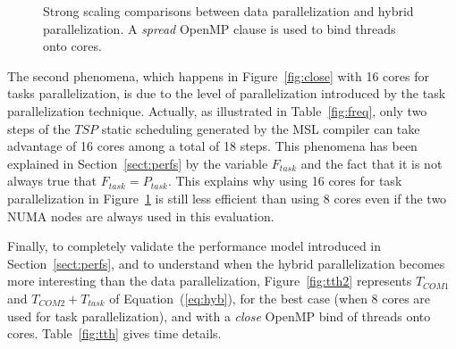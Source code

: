 \begin{figure}[!h]\begin{center}
  \caption{Strong scaling comparisons between data parallelization and hybrid parallelization. A \emph{spread} OpenMP clause is used to bind threads onto cores.}
  \label{fig:spread}
\end{center}\end{figure}

The second phenomena, which happens in Figure~\ref{fig:close} with 16 cores for tasks parallelization, is due to the level of parallelization introduced by the task parallelization technique. Actually, as illustrated in Table~\ref{fig:freq}, only two steps of the $TSP$ static scheduling generated by the MSL compiler can take advantage of 16 cores among a total of 18 steps. This phenomena has been explained in Section~\ref{sect:perfs} by the variable $F_{task}$ and the fact that it is not always true that $F_{task}=P_{task}$. This explains why using 16 cores for task parallelization in Figure~\ref{fig:spread} is still less efficient than using 8 cores even if the two NUMA nodes are always used in this evaluation.

Finally, to completely validate the performance model introduced in Section~\ref{sect:perfs}, and to understand when the hybrid parallelization becomes more interesting than the data parallelization, Figure~\ref{fig:tth2} represents $T_{COM1}$ and $T_{COM2}+T_{task}$ of Equation~(\ref{eq:hyb}), for the best case (\ie when 8 cores are used for task parallelization), and with a \emph{close} OpenMP bind of threads onto cores. Table~\ref{fig:tth} gives time details.

